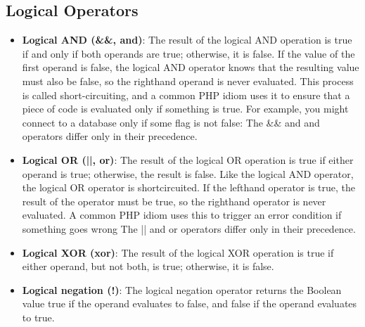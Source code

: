 \documentclass{report}
\begin{document}
\subsection{Logical Operators}
\bigbreak \noindent 
\begin{itemize}
    \item \textbf{Logical AND (\&\&, and)}: The result of the logical AND operation is true if and only if both operands are true; otherwise, it is false. If the value of the first operand is false, the logical AND operator knows that the resulting value must also be false, so the righthand operand is never evaluated. This process is called short-circuiting, and a common PHP idiom uses it to ensure that a piece of code is evaluated only if something is true. For example, you might connect to a database only if some flag is not false:
        \bigbreak \noindent 
    The \&\& and and operators differ only in their precedence.
\item \textbf{Logical OR (||, or)}: The result of the logical OR operation is true if either operand is true; otherwise, the result is false. Like the logical AND operator, the logical OR operator is shortcircuited. If the lefthand operator is true, the result of the operator must be true, so the righthand operator is never evaluated. A common PHP idiom uses this to trigger an error condition if something goes wrong
    \bigbreak \noindent 
    The || and or operators differ only in their precedence.
\item \textbf{Logical XOR (xor)}: The result of the logical XOR operation is true if either operand, but not both, is true; otherwise, it is false.
\item \textbf{Logical negation (!)}: The logical negation operator returns the Boolean value true if the operand evaluates to false, and false if the operand evaluates to true.
    
\end{itemize}

\bigbreak \noindent 
\end{document}
